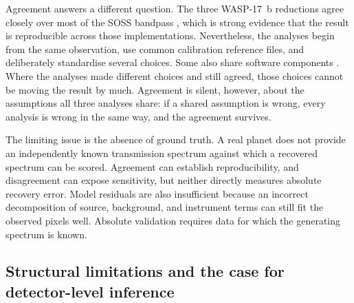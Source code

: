 Agreement answers a different question. The three WASP-17~b reductions agree
closely over most of the SOSS bandpass \citep{LouieEtAl2025}, which is strong
evidence that the result is reproducible across those implementations.
Nevertheless, the analyses begin from the same observation, use common
calibration reference files, and deliberately standardise several choices.
Some also share software components
\citep{BellEtAl2022,RadicaEtAl2023,LouieEtAl2025}. Where the analyses made
different choices and still agreed, those choices cannot be moving the result
by much. Agreement is silent, however, about the assumptions all three
analyses share: if a shared assumption is wrong, every analysis is wrong in
the same way, and the agreement survives.


The limiting issue is the absence of ground truth. A real planet does not
provide an independently known transmission spectrum against which a recovered
spectrum can be scored. Agreement can establish reproducibility, and
disagreement can expose sensitivity, but neither directly measures absolute
recovery error. Model residuals are also insufficient because an incorrect
decomposition of source, background, and instrument terms can still fit the
observed pixels well. Absolute validation requires data for which the generating
spectrum is known.

\subsection{Structural limitations and the case for detector-level inference}
\label{sec:structural-limitations-inference}
\label{sec:structural-limitations}
\label{sec:benchmark-and-nova}


